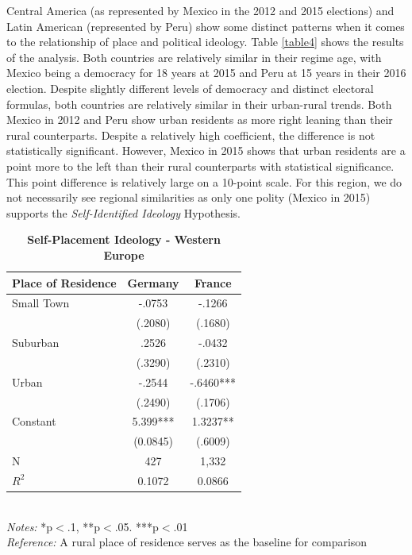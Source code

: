 \documentclass[12pt, titlepage]{article}
\newcommand\e{\emph}
\newcommand\tb{\textbf}
\begin{document}
Central America (as represented by Mexico in the 2012 and 2015 elections) and Latin American (represented by Peru) show some distinct patterns when it comes to the relationship of place and political ideology. Table \ref{table4} shows the results of the analysis. Both countries are relatively similar in their regime age, with Mexico being a democracy for 18 years at 2015 and Peru at 15 years in their 2016 election. Despite slightly different levels of democracy and distinct electoral formulas, both countries are relatively similar in their urban-rural trends. Both Mexico in 2012 and Peru show urban residents as more right leaning than their rural counterparts. Despite a relatively high coefficient, the difference is not statistically significant. However, Mexico in 2015 shows that urban residents are a point more to the left than their rural counterparts with statistical significance. This point difference is relatively large on a 10-point scale. For this region, we do not necessarily see regional similarities as only one polity (Mexico in 2015) supports the \e{Self-Identified Ideology} Hypothesis.

\begin{singlespace}
\begin{table}[H]
		\centering
		\caption{\tb{Self-Placement Ideology - Western Europe}}
		\begin{tabulary}{\linewidth}{l c c }

			\hline
			\tb{Place of Residence}&\tb{Germany}&\tb{France} \\
			\hline
			Small Town   & -.0753 &-.1266  \\      
			& (.2080)  & (.1680)   \\
			Suburban   & .2526 & -.0432    \\ 
			 & (.3290)  & (.2310)    \\
			Urban   & -.2544 & -.6460***    \\
			 &(.2490)  & (.1706)   \\
			Constant  & 5.399***  & 1.3237** \\
			&(0.0845)&(.6009) \\
			N  &427  & 1,332    \\
			$R^2$  &0.1072 &0.0866  \\
			\hline                                       
		\end{tabulary} 
		\\
		\e{Notes:} *p$<$.1, **p$<$.05. ***p$<$.01 \\
		\e{Reference:} A rural place of residence serves as the baseline for comparison
		\label{table5}
\end{table}
\end{singlespace}
\end{document}
